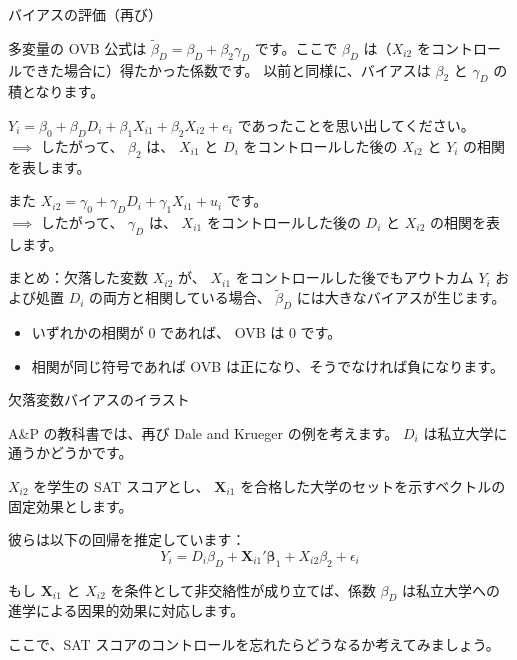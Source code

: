 \documentclass[11pt,handout]{beamer}
\newenvironment{wideitemize}{\itemize\addtolength{\itemsep}{10pt}}{\enditemize}
\begin{document}
\begin{frame}{バイアスの評価（再び）}
%
	\begin{wideitemize}
		\item
		多変量の OVB 公式は $\tilde\beta_D=\beta_D+\beta_2\gamma_D$ です。ここで $\beta_D$ は（$X_{i2}$ をコントロールできた場合に）得たかった係数です。 \pause 以前と同様に、バイアスは $\beta_2$ と $\gamma_D$ の積となります。
		
		
		\pause
		\item
		$Y_i = \beta_0 + \beta_{D} D_i + \beta_{1} X_{i1} + \beta_{2} X_{i2}+e_i$ であったことを思い出してください。 \\
		$\implies$ したがって、 $\beta_2$ は、 $X_{i1}$ と $D_i$ をコントロールした後の $X_{i2}$ と $Y_i$ の相関を表します。
		
		\pause
		\item
		また $X_{i2} = \gamma_0 + \gamma_D D_i + \gamma_1 X_{i1}+ u_i$ です。 \\
		$\implies$ したがって、 $\gamma_D$ は、 $X_{i1}$ をコントロールした後の $D_i$ と $X_{i2}$ の相関を表します。
		
		\pause
		\item
		まとめ：欠落した変数 $X_{i2}$ が、 $X_{i1}$ をコントロールした後でもアウトカム $Y_i$ および処置 $D_i$ の両方と相関している場合、 $\tilde\beta_D$ には大きなバイアスが生じます。 \smallskip\pause{}

\begin{itemize}
\item いずれかの相関が 0 であれば、 OVB は 0 です。 \smallskip\pause{}
\item 相関が同じ符号であれば OVB は正になり、そうでなければ負になります。
\end{itemize}
		
	\end{wideitemize}
	
\end{frame}


\begin{frame}{欠落変数バイアスのイラスト}
\begin{wideitemize}
	\item
	A\&P の教科書では、再び Dale and Krueger の例を考えます。 $D_i$ は私立大学に通うかどうかです。
	
	\pause
	\item
	$X_{i2}$ を学生の SAT スコアとし、 $\bm{X}_{i1}$ を合格した大学のセットを示すベクトルの固定効果とします。
	
	\pause
	\item
	彼らは以下の回帰を推定しています：
	$$Y_{i} = D_i \beta_D + \bm{X}_{i1}' \bm\beta_1 + X_{i2} \beta_2 + \epsilon_i $$
	
	\pause
	\item
	もし $\bm{X}_{i1}$ と $X_{i2}$ を条件として非交絡性が成り立てば、係数 $\beta_D$ は私立大学への進学による因果的効果に対応します。
	
	\pause
	\item
	ここで、SAT スコアのコントロールを忘れたらどうなるか考えてみましょう。
\end{wideitemize}
\end{frame}
\end{document}
